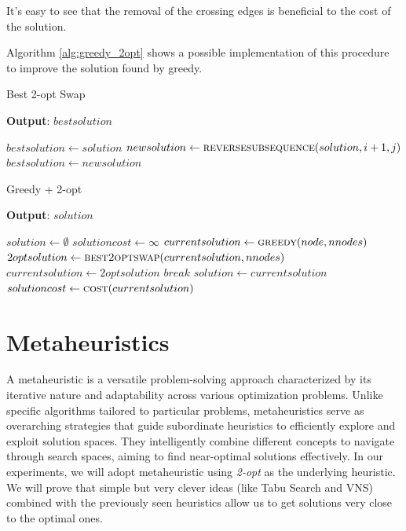 \documentclass{article}
\begin{document}
It's easy to see that the removal of the crossing edges is beneficial to the
cost of the solution.

Algorithm \ref{alg:greedy_2opt} shows a possible implementation of this procedure to improve
the solution found by greedy.

\begin{algorithm}[h]
\caption{Best 2-opt Swap}
\label{alg:best2optswap}
\hspace*{0.5em} \textbf{Output}: $bestsolution$
\begin{algorithmic}
	    \State $bestsolution \gets solution$
	            \State $newsolution \gets \Call{reversesubsequence}{solution, i + 1, j}$
	                \State $bestsolution \gets newsolution$
	            \EndIf
	        \EndFor
	    \EndFor
	\EndProcedure
\end{algorithmic}
\end{algorithm}

\begin{algorithm}[h]
\caption{Greedy + 2-opt}
\label{alg:greedy_2opt}
\hspace*{0.5em} \textbf{Output}: $solution$
\begin{algorithmic}
	\State $solution \gets \emptyset$
	\State $solutioncost \gets \infty$
		\State $currentsolution \gets \Call{greedy}{node, nnodes}$
			\State $2optsolution \gets \Call{best2optswap}{currentsolution, nnodes}$
				\State $currentsolution \gets 2optsolution$
			\Else
				\State $break$
			\EndIf
		\EndWhile
			\State $solution \gets currentsolution$
			\State $solutioncost \gets \Call{cost}{currentsolution}$
		\EndIf
	\EndFor
  \EndProcedure

\end{algorithmic}
\end{algorithm}

\section{Metaheuristics}
A metaheuristic is a versatile problem-solving approach characterized by its iterative nature and adaptability across various optimization problems. Unlike specific algorithms tailored to particular problems, metaheuristics serve as overarching strategies that guide subordinate heuristics to efficiently explore and exploit solution spaces. They intelligently combine different concepts to navigate through search spaces, aiming to find near-optimal solutions effectively.
In our experiments, we will adopt metaheuristic using \textit{2-opt} as the underlying
heuristic. We will prove that simple but very clever ideas (like Tabu Search and VNS) combined with the previously seen heuristics allow us to get solutions very close to the optimal ones.
\end{document}
